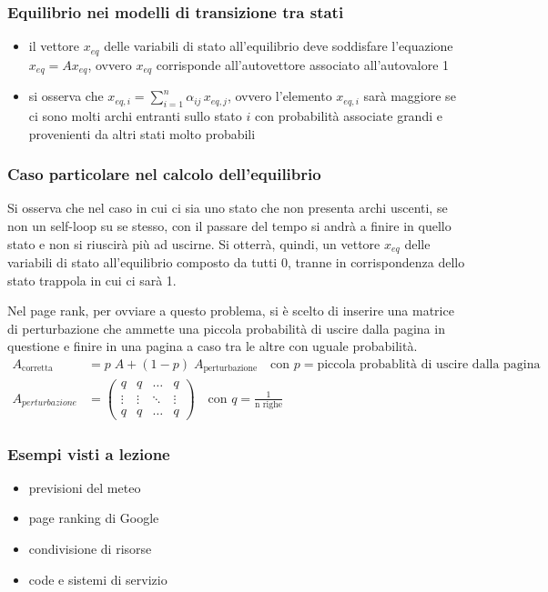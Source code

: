\subsubsection*{Equilibrio nei modelli di transizione tra stati}
\begin{itemize}
	\item il vettore \(x_{eq}\) delle variabili di stato all'equilibrio deve soddisfare l'equazione \(x_{eq} = A x_{eq}\), ovvero
	\(x_{eq}\) corrisponde all'autovettore associato all'autovalore 1
	\item si osserva che \(\displaystyle x_{eq,i} = \sum_{i=1}^{n} \alpha_{ij} \, x_{eq,j}\), ovvero l'elemento \(x_{eq,i}\) sarà maggiore
	se ci sono molti archi entranti sullo stato \(i\) con probabilità associate grandi e provenienti da altri stati molto probabili
\end{itemize}

\newpage

\subsubsection*{Caso particolare nel calcolo dell'equilibrio}
Si osserva che nel caso in cui ci sia uno stato che non presenta archi uscenti, se non un self-loop su se stesso, con il passare
del tempo si andrà a finire in quello stato e non si riuscirà più ad uscirne. Si otterrà, quindi, un vettore \(x_{eq}\) delle
variabili di stato all'equilibrio composto da tutti 0, tranne in corrispondenza dello stato trappola in cui ci sarà 1.

Nel page rank, per ovviare a questo problema, si è scelto di inserire una matrice di perturbazione che ammette una piccola
probabilità di uscire dalla pagina in questione e finire in una pagina a caso tra le altre con uguale probabilità.
\begin{align*}
	A_\text{corretta} &= p \; A + (1-p) \; A_\text{perturbazione} \quad \text{con } p = \text{piccola probablità di uscire dalla pagina} \\[5pt]
	A_{perturbazione} &= \left(\begin{matrix} q & q & \dots & q \\ \vdots & \vdots & \ddots & \vdots \\ q & q & \dots & q \end{matrix}\right) \quad \text{con } q = \frac{1}{\text{n righe}}
\end{align*}

\subsubsection*{Esempi visti a lezione}
\begin{itemize}
	\item previsioni del meteo
	\item page ranking di Google
	\item condivisione di risorse
	\item code e sistemi di servizio
\end{itemize}

